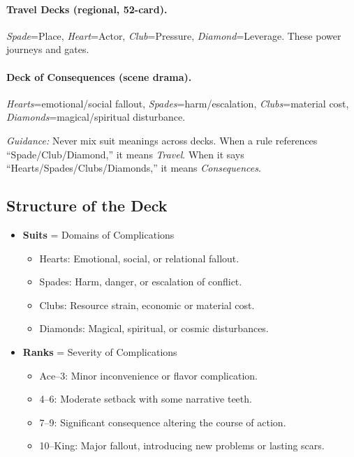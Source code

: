 \documentclass[11pt]{article}
\begin{document}
\paragraph{Travel Decks (regional, 52-card).}
\emph{Spade}=Place, \emph{Heart}=Actor, \emph{Club}=Pressure, \emph{Diamond}=Leverage. These power journeys and gates.

\paragraph{Deck of Consequences (scene drama).}
\emph{Hearts}=emotional/social fallout, \emph{Spades}=harm/escalation, \emph{Clubs}=material cost, \emph{Diamonds}=magical/spiritual disturbance.

\textit{Guidance:} Never mix suit meanings across decks. When a rule references ``Spade/Club/Diamond,'' it means \emph{Travel}. When it says ``Hearts/Spades/Clubs/Diamonds,'' it means \emph{Consequences}.

\subsection{Structure of the Deck}
\begin{itemize}
    \item \textbf{Suits} = Domains of Complications
    \begin{itemize}
        \item Hearts: Emotional, social, or relational fallout.
        \item Spades: Harm, danger, or escalation of conflict.
        \item Clubs: Resource strain, economic or material cost.
        \item Diamonds: Magical, spiritual, or cosmic disturbances.
    \end{itemize}
    \item \textbf{Ranks} = Severity of Complications
    \begin{itemize}
        \item Ace–3: Minor inconvenience or flavor complication.
        \item 4–6: Moderate setback with some narrative teeth.
        \item 7–9: Significant consequence altering the course of action.
        \item 10–King: Major fallout, introducing new problems or lasting scars.
    \end{itemize}
\end{itemize}
\end{document}

